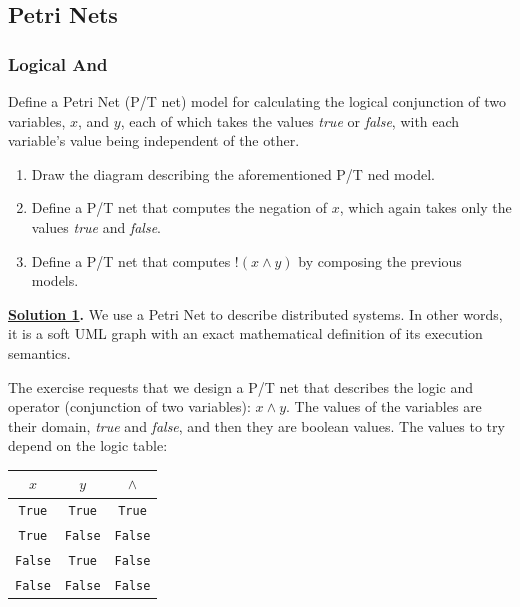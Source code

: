 \subsection{Petri Nets}

\subsubsection{Logical And}

\descriptionproblem
Define a Petri Net (P/T net) model for calculating the logical conjunction of two variables, $x$, and $y$, each of which takes the values \emph{true} or \emph{false}, with each variable's value being independent of the other.

\questionproblem
\begin{enumerate}
    \item Draw the diagram describing the aforementioned P/T ned model.

    \item Define a P/T net that computes the negation of $x$, which again takes only the values \emph{true} and \emph{false}.
    
    \item Define a P/T net that computes $!\left(x \land y\right)$ by composing the previous models.
\end{enumerate}

\solution
\textbf{\underline{Solution 1}.} We use a Petri Net to describe distributed systems. In other words, it is a soft UML graph with an exact mathematical definition of its execution semantics.


The exercise requests that we design a P/T net that describes the logic and operator (conjunction of two variables): $x \land y$. The values of the variables are their domain, \emph{true} and \emph{false}, and then they are boolean values. The values to try depend on the logic table:

\begin{table}[!htp]
    \centering
    \begin{tabular}{@{} c c c @{}}
        \toprule
        $x$ & $y$ & $\land$ \\
        \midrule
        \texttt{True} & \texttt{True} & \texttt{True} \\
        \texttt{True} & \texttt{False} & \texttt{False} \\
        \texttt{False} & \texttt{True} & \texttt{False} \\
        \texttt{False} & \texttt{False} & \texttt{False} \\
        \bottomrule
    \end{tabular}
\end{table}

